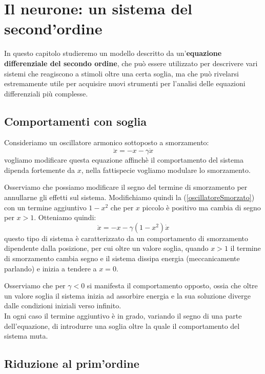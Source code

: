 \section{Il neurone: un sistema del second'ordine}

In questo capitolo studieremo un modello descritto da un'\textbf{equazione differenziale del secondo ordine}, che può essere utilizzato per descrivere vari sistemi che reagiscono a stimoli oltre una certa soglia, ma che può rivelarsi estremamente utile per acquisire nuovi strumenti per l'analisi delle equazioni differenziali più complesse.

\subsection{Comportamenti con soglia} 

Consideriamo un oscillatore armonico sottoposto a smorzamento:
\begin{equation}
	\ddot{x}=-x-\gamma\dot{x} \label{oscillatoreSmorzato}
\end{equation}
vogliamo modificare questa equazione affinchè il comportamento del sistema dipenda fortemente da $x$, nella fattispecie vogliamo modulare lo smorzamento. 

Osserviamo che possiamo modificare il segno del termine di smorzamento per annullarne gli effetti sul sistema. Modifichiamo quindi la (\ref{oscillatoreSmorzato}) con un termine aggiuntivo $1-x^2$ che per $x$ piccolo è positivo ma cambia di segno per $x>1$. Otteniamo quindi: 
\begin{equation}
	\ddot{x}=-x-\gamma(1-x^2)\dot{x} \label{pendoloSoglia}
\end{equation}
questo tipo di sistema è caratterizzato da un comportamento di smorzamento dipendente dalla posizione, per cui oltre un valore soglia, quando $x>1$ il termine di smorzamento cambia segno e il sistema dissipa energia (meccanicamente parlando) e inizia a tendere a $x=0$.

Osserviamo che per $\gamma<0$ si manifesta il comportamento opposto, ossia che oltre un valore soglia il sistema inizia ad assorbire energia e la sua soluzione diverge dalle condizioni iniziali verso infinito.\\

In ogni caso il termine aggiuntivo è in grado, variando il segno di una parte dell'equazione, di introdurre una soglia oltre la quale il comportamento del sistema muta. 

\subsection{Riduzione al prim'ordine}

